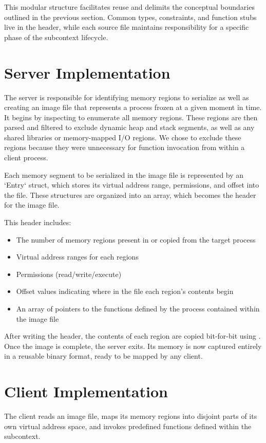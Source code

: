 This modular structure facilitates reuse and delimits the conceptual boundaries outlined in the previous section. Common types, constraints, and function stubs live in the header, while each source file maintains responsibility for a specific phase of the subcontext lifecycle.

\section*{Server Implementation}
The server is responsible for identifying memory regions to serialize as well as creating an image file that represents a process frozen at a given moment in time. It begins by inspecting  to enumerate all memory regions. These regions are then parsed and filtered to exclude dynamic heap and stack segments, as well as any shared libraries or memory-mapped I/O regions. We chose to exclude these regions because they were unnecessary for function invocation from within a client process.

Each memory segment to be serialized in the image file is represented by an `Entry` struct, which stores its virtual address range, permissions, and offset into the file. These structures are organized into an array, which becomes the header for the image file.

This header includes:
\begin{itemize}
    \item The number of memory regions present in or copied from the target process
    \item Virtual address ranges for each regions
    \item Permissions (read/write/execute)
    \item Offset values indicating where in the file each region's contents begin
    \item An array of pointers to the functions defined by the process contained within the image file
\end{itemize}

After writing the header, the contents of each region are copied bit-for-bit using . Once the image is complete, the server exits. Its memory is now captured entirely in a reusable binary format, ready to be mapped by any client.

\section*{Client Implementation}
The client reads an image file, maps its memory regions into disjoint parts of its own virtual address space, and invokes predefined functions defined within the subcontext.

